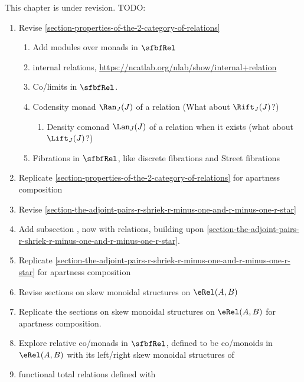 This chapter is under revision. TODO:
\begin{enumerate}
    \item Revise \cref{section-properties-of-the-2-category-of-relations}
        \begin{enumerate}
            \item Add modules over monads in $\sfbfRel$
            \item internal relations, \url{https://ncatlab.org/nlab/show/internal+relation}
            \item Co/limits in $\sfbfRel$.
            \item Codensity monad $\Ran_{J}(J)$ of a relation (What about $\Rift_{J}(J)$?)
                \begin{enumerate}
                    \item Density comonad $\Lan_{J}(J)$ of a relation when it exists (what about $\Lift_{J}(J)$?)
                \end{enumerate}
            \item Fibrations in $\sfbfRel$, like discrete fibrations and Street fibrations
        \end{enumerate}
    \item Replicate \cref{section-properties-of-the-2-category-of-relations} for apartness composition
    \item Revise \cref{section-the-adjoint-pairs-r-shriek-r-minus-one-and-r-minus-one-r-star}
    \item Add subsection , now with relations, building upon \cref{section-the-adjoint-pairs-r-shriek-r-minus-one-and-r-minus-one-r-star}.
    \item Replicate \cref{section-the-adjoint-pairs-r-shriek-r-minus-one-and-r-minus-one-r-star} for apartness composition
    \item Revise sections on skew monoidal structures on $\eRel(A,B)$
    \item Replicate the sections on skew monoidal structures on $\eRel(A,B)$ for apartness composition.
    \item Explore relative co/monads in $\sfbfRel$, defined to be co/monoids in $\eRel(A,B)$ with its left/right skew monoidal structures of 
    \item functional total relations defined with 

\end{enumerate}
